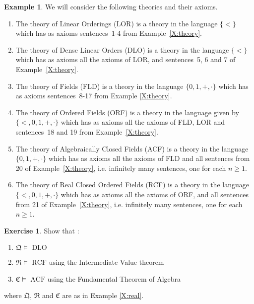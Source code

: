 \documentclass[titlepage, oneside]{amsbook}
\theoremstyle{plain}
\theoremstyle{definition}
\newtheorem{exercise}{Exercise}
\newtheorem{examples}{Example}
\theoremstyle{remark}
\begin{document}
\begin{examples}\label{X:axioms}
%
%
%
%
%
%
%
%
%
%
%
%
  We will consider the following theories and their axioms.
\begin{enumerate} 



\item The theory of Linear Orderings (LOR) is a theory in the language 
$\{ < \}$ which has as axioms sentences~1-4 from
Example~\ref{X:theory}.

\item The theory of Dense Linear Orders (DLO) is a theory in the language 
$\{ < \}$ which has as axioms all the axioms of LOR, and sentences~5, 6 and 7 of Example~\ref{X:theory}.

\item The theory of Fields (FLD) is a theory in the language 
$\{0, 1, +, \cdot \}$  which has as  axioms sentences~8-17 from Example \ref{X:theory}.

\item The theory of Ordered Fields (ORF) is a theory in the language given by  
$\{<,0,1,+,\cdot \}$ which has as axioms all the axioms of FLD, LOR and  sentences~18 and 19 from Example~\ref{X:theory}.

\item The theory of Algebraically Closed Fields (ACF) is a theory in the language 
$\{0,1, +, \cdot \}$ which has as axioms all the axioms of FLD  and all sentences from 20 of Example~\ref{X:theory}, i.e. infinitely many sentences, one for each 
$n \geq 1$.


\item The theory of Real Closed Ordered Fields (RCF) is a theory in the language 
$\{ < ,0 ,1, +, \cdot \}$ which has as axioms all the axioms of ORF, and all sentences from 21 of Example~\ref{X:theory}, i.e. infinitely many sentences, one for each $n \geq 1$.


\end{enumerate}

\end{examples}

\begin{exercise}\label{X:dloivt} Show that :
\begin{enumerate}
\item $\mathfrak Q \models \mbox{ DLO}$
\item $\mathfrak R \models \mbox{ RCF}$ using the Intermediate Value
theorem
\item $\mathfrak C \models \mbox{ ACF}$ using the Fundamental Theorem of
Algebra
\end{enumerate}
where $\mathfrak Q$, $\mathfrak R$ and $\mathfrak C$ are as in Example
\ref{X:real}.
\end{exercise}
\end{document}
